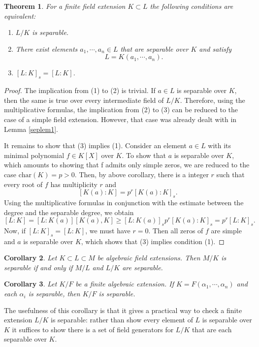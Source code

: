 \documentclass[12pt]{report}
\newtheorem{thm}{Theorem}[section]
\newtheorem{cor}[thm]{Corollary}
\theoremstyle{definition}
\def\aa{\alpha}
\def\char{\text{char}}
\begin{document}
\begin{thm}
    For a finite field extension $K \subset L$ the following conditions are equivalent: \begin{enumerate}
        \item $L/K$ is separable.
        \item There exist elements $a_1, \cdots, a_n \in L$ that are separable over $K$ and satisfy $$L = K(a_1, \cdots, a_n).$$
        \item $[L : K]_s = [L : K]$.
    \end{enumerate}
\end{thm}

\begin{proof}
    The implication from (1) to (2) is trivial. If $a \in L$ is separable over $K$, then the same is true over every intermediate field of $L/K$. Therefore, using the multiplicative formulas, the implication from (2) to (3) can be reduced to the case of a simple field extension. However, that case was already dealt with in Lemma \ref{seplem1}.

    It remains to show that (3) implies (1). Consider an element $a \in L$ with its minimal polynomial $f \in K[X]$ over $K$. To show that $a$ is separable over $K$, which amounts to showing that f admits only simple zeros, we are reduced to the case $\char(K) = p > 0$. Then, by above  corollary, there is a integer $r$ such that every root of $f$ has multiplicity $r$ and  
    $$[K(a):K] = p^r[K(a):K]_s.$$
    Using the multiplicative formulas in conjunction with the estimate between the degree and the separable degree, we obtain
    $$[L:K]=[L:K(a)][K(a),K] \geq [L:K(a)]_s p^r [K(a):K]_s= p^r[L:K]_s.$$
    Now, if $[L : K]_s = [L : K]$, we must have $r = 0$. Then all zeros of $f$ are simple and $a$ is separable over $K$, which shows that (3) implies condition (1).
\end{proof}

\begin{cor}
    Let $K \subset L \subset M$ be algebraic field extensions. Then $M/K$ is separable if and only if $M/L$ and $L/K$ are separable. 
\end{cor}

\begin{cor}
    Let $K/F$ be a finite algebraic extension. If $K=F(\aa_1,\cdots,\aa_n)$ and each $\aa_i$ is separable, then $K/F$ is separable. 
\end{cor}

The usefulness of this corollary is that it gives a practical way to check a finite extension $L/K$ is separable: rather than show every element of $L$ is separable over $K$ it suffices to show there is a set of field generators for $L/K$ that are each separable over $K$.
\end{document}
